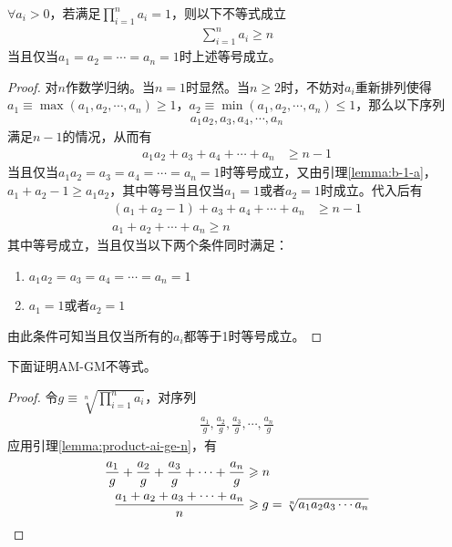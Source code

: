 \begin{lemma}\label{lemma:product-ai-ge-n}
  $\forall a_i>0$，若满足$\prod_{i=1}^n a_i=1$，则以下不等式成立
  \begin{align}
    \sum_{i=1}^n a_i\ge n
  \end{align}
  当且仅当$a_1=a_2=\cdots=a_n=1$时上述等号成立。
\end{lemma}
\begin{proof}
  对$n$作数学归纳。当$n=1$时显然。当$n\ge2$时，不妨对$a_i$重新排列使得$a_1\equiv\max(a_1,a_2,\cdots,a_n)\ge1$，$a_2\equiv\min(a_1,a_2,\cdots,a_n)\le1$，那么以下序列
  \begin{align*}
    a_1a_2, a_3, a_4, \cdots, a_n
  \end{align*}
  满足$n-1$的情况，从而有
  \begin{align*}
    a_1a_2 + a_3+ a_4+ \cdots + a_n &\ge n-1
  \end{align*}
  当且仅当$a_1a_2=a_3=a_4=\cdots=a_n=1$时等号成立，又由引理\ref{lemma:b-1-a}，$a_1+a_2 - 1\ge a_1a_2$，其中等号当且仅当$a_1=1$或者$a_2=1$时成立。代入后有
  \begin{align*}
    (a_1 + a_2 - 1) + a_3+ a_4+ \cdots + a_n &\ge n-1\\
    a_1 + a_2 + \cdots + a_n\ge n
  \end{align*}
  其中等号成立，当且仅当以下两个条件同时满足：
  \begin{enumerate}
  \item $a_1a_2=a_3=a_4=\cdots=a_n=1$
  \item $a_1=1$或者$a_2=1$
  \end{enumerate}
  由此条件可知当且仅当所有的$a_i$都等于1时等号成立。
\end{proof}

下面证明AM-GM不等式。
\begin{proof}
  令$g\equiv\sqrt[n]{\prod\limits_{i=1}^n a_i}$，对序列
  \begin{align*}
    \frac{a_1}{g}, \frac{a_2}{g}, \frac{a_3}{g}, \cdots, \frac{a_n}{g}
  \end{align*}
  应用引理\ref{lemma:product-ai-ge-n}，有
  \begin{align*}
    \frac{a_1}{g} + \frac{a_2}{g} + \frac{a_3}{g} + \cdots + \frac{a_n}{g}&\ge n\\
    \frac{a_1 + a_2 + a_3 + \cdots + a_n}{n}&\ge g = \sqrt[n]{a_1a_2a_3\cdots a_n} \qedhere
  \end{align*}
\end{proof}

